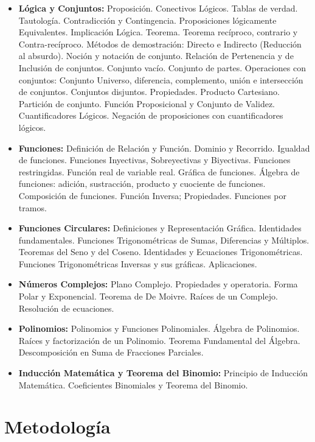 \documentclass[11pt]{article}
\begin{document}
\begin{itemize}
\item \textbf{Lógica y Conjuntos:} Proposición. Conectivos Lógicos. Tablas de verdad. Tautología. Contradicción y Contingencia. Proposiciones lógicamente Equivalentes. Implicación Lógica. Teorema. Teorema recíproco, contrario y Contra-recíproco. Métodos de demostración: Directo e Indirecto (Reducción al absurdo). Noción y notación de conjunto. Relación de Pertenencia y de Inclusión de conjuntos. Conjunto vacío. Conjunto de partes. Operaciones con conjuntos: Conjunto Universo, diferencia, complemento, unión e intersección de conjuntos. Conjuntos disjuntos. Propiedades. Producto Cartesiano. Partición de conjunto.  Función Proposicional y Conjunto de Validez. Cuantificadores Lógicos. Negación de proposiciones con cuantificadores lógicos.

\item \textbf{Funciones:} Definición de Relación y Función. Dominio y Recorrido. Igualdad de funciones. Funciones Inyectivas, Sobreyectivas y Biyectivas. Funciones restringidas. Función real de variable real. Gráfica de funciones. Álgebra de funciones: adición, sustracción, producto y cuociente de funciones. Composición de funciones. Función Inversa; Propiedades. Funciones por tramos.

\item \textbf{Funciones Circulares:} Definiciones y Representación Gráfica. Identidades fundamentales. Funciones Trigonométricas de Sumas, Diferencias y Múltiplos. Teoremas del Seno y del Coseno. Identidades y Ecuaciones Trigonométricas. Funciones Trigonométricas Inversas y sus gráficas. Aplicaciones.

\item \textbf{Números Complejos:} Plano Complejo. Propiedades y operatoria. Forma Polar y Exponencial. Teorema de De Moivre. Raíces de un Complejo. Resolución de ecuaciones.

\item \textbf{Polinomios:} Polinomios y Funciones Polinomiales. Álgebra de Polinomios. Raíces y factorización de un Polinomio. Teorema Fundamental del Álgebra. Descomposición en Suma de Fracciones Parciales.

\item \textbf{Inducción Matemática y Teorema del Binomio:} Principio de Inducción Matemática. Coeficientes Binomiales y Teorema del Binomio.
\end{itemize}


\section{Metodología}
\label{sec:org0c05697}
\end{document}
